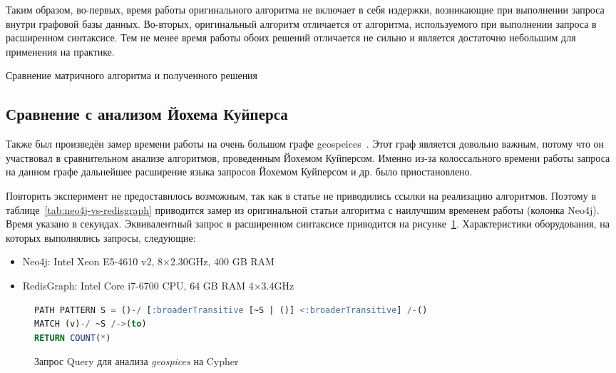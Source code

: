 Таким образом, во-первых, время работы оригинального алгоритма не включает в себя издержки, возникающие при выполнении запроса внутри графовой базы данных. Во-вторых, оригинальный алгоритм отличается от алгоритма, используемого при выполнении запроса в расширенном синтаксисе. Тем не менее время работы обоих решений отличается не сильно и является достаточно небольшим для применения на практике.
\begin{table}[h!]
\begin{adjustbox}{max width=\textwidth}

\end{adjustbox}
\caption{Сравнение матричного алгоритма и полученного решения}
\label{tab:combinators_vs_redisgraph}
\end{table}

\subsection{Сравнение с анализом Йохема Куйперса}
Также был произведён замер времени работы на очень большом графе geospeices~\cite{geospices}. Этот граф является довольно важным, потому что он участвовал в сравнительном анализе алгоритмов, проведенным Йохемом Куйперсом. Именно из-за колоссального времени работы запроса на данном графе дальнейшее расширение языка запросов Йохемом Куйперсом и др. было приостановлено. 

Повторить эксперимент не предоставилось возможным, так как в статье не приводились ссылки на реализацию алгоритмов. Поэтому в таблице~\ref{tab:neo4j-vs-redisgraph} приводится замер из оригинальной статьи алгоритма с наилучшим временем работы (колонка Neo4j). Время указано в секундах. Эквивалентный запрос в расширенном синтаксисе приводится на рисунке~\ref{code:broaderTransitive}. Характеристики оборудования, на которых выполнялись запросы, следующие:

\begin{itemize}
    \item Neo4j: Intel Xeon E5-4610 v2, 8$\times$2.30GHz, 400 GB RAM
    \item RedisGraph: Intel Core i7-6700 CPU, 64 GB RAM 4$\times$3.4GHz
\end{itemize}

\begin{figure}[h!]
\begin{adjustbox}{max width=\textwidth}
\begin{lstlisting}[language=sql]
PATH PATTERN S = ()-/ [:broaderTransitive [~S | ()] <:broaderTransitive] /-()
MATCH (v)-/ ~S /->(to)
RETURN COUNT(*)
\end{lstlisting}
\end{adjustbox}
\caption{Запрос Query для анализа \textit{geospices} на Cypher }
\label{code:broaderTransitive}
\end{figure}

